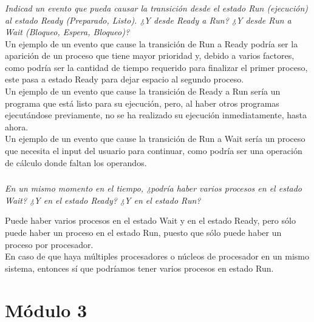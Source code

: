 \documentclass[spanish]{article}
\begin{document}
\subsubsection{}

\textit{Indicad un evento que pueda causar la transición
desde el estado Run (ejecución) al estado Ready (Preparado,
Listo). ¿Y desde Ready a Run? ¿Y desde Run a Wait (Bloqueo,
Espera, Bloqueo)?}\\

Un ejemplo de un evento que cause la transición de Run a
Ready podría ser la aparición de un proceso que tiene mayor
prioridad y, debido a varios factores, como podría ser la
cantidad de tiempo requerido para finalizar el primer
proceso, este pasa a estado Ready para dejar espacio al
segundo proceso.\\

Un ejemplo de un evento que cause la transición de Ready a
Run sería un programa que está listo para su ejecución,
pero, al haber otros programas ejecutándose previamente, no
se ha realizado su ejecución inmediatamente, hasta ahora.\\

Un ejemplo de un evento que cause la transición de Run a
Wait sería un proceso que necesita el input del usuario para
continuar, como podría ser una operación de cálculo donde
faltan los operandos.\\

\subsubsection{}

\textit{En un mismo momento en el tiempo, ¿podría haber
varios procesos en el estado Wait? ¿Y en el estado Ready? ¿Y
en el estado Run?}

Puede haber varios procesos en el estado Wait y en el
estado Ready, pero sólo puede haber un proceso en el estado
Run, puesto que sólo puede haber un proceso por
procesador.\\

En caso de que haya múltiples procesadores o núcleos de
procesador en un mismo sistema, entonces sí que podríamos
tener varios procesos en estado Run.\\

\newpage

\section{Módulo 3}
\end{document}
